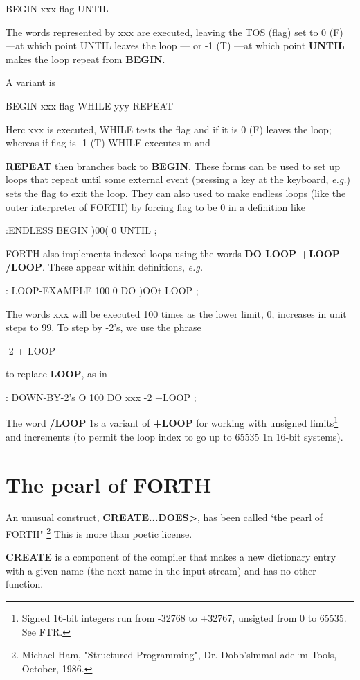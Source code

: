 BEGIN xxx ﬂag UNTIL

The words represented by xxx are executed, leaving the TOS (ﬂag) set to 0 (F) —at which point UNTIL leaves the loop — or -1 (T) —at which point \textbf{UNTIL} makes the loop repeat from \textbf{BEGIN}.

A variant is

BEGIN xxx ﬂag WHILE yyy REPEAT

Herc xxx is executed, WHILE tests the ﬂag and if it is 0 (F) leaves
the loop; whereas if flag is -1 (T) WHILE executes m and

\textbf{REPEAT} then branches back to \textbf{BEGIN}. These forms can be used to set up loops that repeat until some external event (pressing a key at the keyboard, \textit{\textit{e.g.}}) sets the ﬂag to exit the loop. They can also used to make endless loops (like the outer interpreter of FORTH) by forcing flag to be 0 in a definition like

:ENDLESS BEGIN )00( 0 UNTIL ;

FORTH also implements indexed loops using the words \textbf{DO LOOP +LOOP /LOOP}. These appear within definitions, \textit{\textit{e.g.}}

: LOOP-EXAMPLE 100 0 DO )OOt LOOP ;

The words xxx will be executed 100 times as the lower limit, 0, increases in unit steps to 99. To step by -2's, we use the phrase

-2 + LOOP

to replace \textbf{LOOP}, as in

: DOWN-BY-2's O 100 DO xxx -2 +LOOP ;

The word \textbf{/LOOP} 1s a variant of \textbf{+LOOP} for working with unsigned limits\footnote{Signed 16-bit integers run from -32768 to +32767, unsigted from 0 to 65535. See FTR.} and increments (to permit the loop index to go up to 65535 1n 16-bit systems).

\section{The pearl of FORTH}

An unusual construct, \textbf{CREATE...DOES\textgreater}, has been called ‘the pearl of FORTH" \footnote{Michael Ham, "Structured Programming", Dr. Dobb’slmmal adel‘m Tools, October, 1986.} This is more than poetic license.

\textbf{CREATE} is a component of the compiler that makes a new dictionary entry with a given name (the next name in the input stream) and has no other function.


